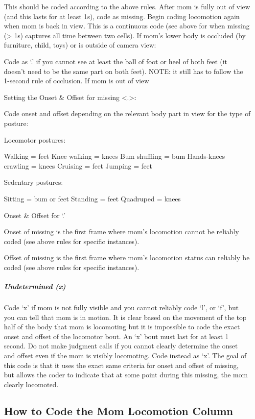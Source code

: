 \documentclass[
  12pt,
]{book}
\begin{document}
This should be coded according to the above rules. After mom is fully out of view (and this lasts for at least 1s), code as missing. Begin coding locomotion again when mom is back in view. This is a continuous code (see above for when missing (\textgreater{} 1s) captures all time between two cells).
If mom's lower body is occluded (by furniture, child, toys) or is outside of camera view:

Code as `.' if you cannot see at least the ball of foot or heel of both feet (it doesn't need to be the same part on both feet). NOTE: it still has to follow the 1-second rule of occlusion.
If mom is out of view

Setting the Onset \& Offset for missing \textless.\textgreater:

Code onset and offset depending on the relevant body part in view for the type of posture:

Locomotor postures:

Walking = feet
Knee walking = knees
Bum shuffling = bum
Hands-knees crawling = knees
Cruising = feet
Jumping = feet

Sedentary postures:

Sitting = bum or feet
Standing = feet
Quadruped = knees

Onset \& Offset for `.'

Onset of missing is the first frame where mom's locomotion cannot be reliably coded (see above rules for specific instances).

Offset of missing is the first frame where mom's locomotion status can reliably be coded (see above rules for specific instances).

\hypertarget{mom_undetermined}{%
\subparagraph*{Undetermined (x)}\label{mom_undetermined}}

Code `x' if mom is not fully visible and you cannot reliably code `l', or `f', but you can tell that mom is in motion. It is clear based on the movement of the top half of the body that mom is locomoting but it is impossible to code the exact onset and offset of the locomotor bout. An `x' bout must last for at least 1 second.
Do not make judgment calls if you cannot clearly determine the onset and offset even if the mom is visibly locomoting. Code instead as `x'.
The goal of this code is that it uses the exact same criteria for onset and offset of missing, but allows the coder to indicate that at some point during this missing, the mom clearly locomoted.

\hypertarget{how-to-code-the-mom-locomotion-column}{%
\subsection*{How to Code the Mom Locomotion Column}\label{how-to-code-the-mom-locomotion-column}}
\end{document}
